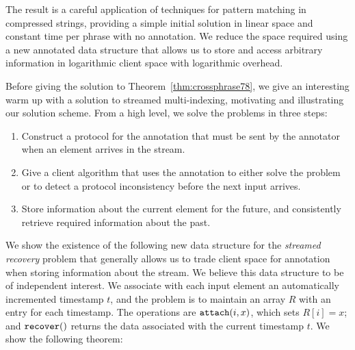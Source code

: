 The result is a careful application of techniques for pattern matching in compressed strings, providing a simple initial solution in linear space and constant time per phrase with no annotation.
We reduce the space required using a new annotated data structure that allows us to store and access arbitrary information in logarithmic client space with logarithmic overhead.

Before giving the solution to Theorem~\ref{thm:crossphrase78}, we give an interesting warm up with a solution to streamed multi-indexing, motivating and illustrating our solution scheme.
From a high level, we solve the problems in three steps:
\begin{enumerate}
    \item Construct a protocol for the annotation that must be sent by the annotator when an element arrives in the stream. 
    \item Give a client algorithm that uses the annotation to either solve the problem or to detect a protocol inconsistency before the next input arrives. 
    \item Store information about the current element for the future, and consistently retrieve required information about the past.
\end{enumerate}

We show the existence of the following new data structure for the \emph{streamed recovery} problem that generally allows us to trade client space for annotation when storing information about the stream. We believe this data structure to be of independent interest. 
We associate with each input element an automatically incremented timestamp $t$, and the problem is to maintain an array $R$ with an entry for each timestamp. The operations are $\mathtt{attach}(i, x)$, which sets $R[i] = x$; and $\mathtt{recover}()$ returns the data associated with the current timestamp $t$. We show the following theorem:

